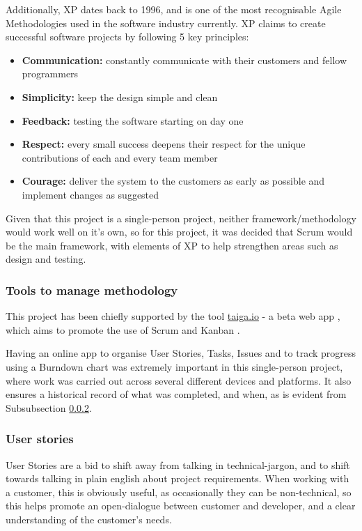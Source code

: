 Additionally, \acrfull{XP} \cite{xp} dates back to 1996, and is one of the most recognisable Agile Methodologies used in the software industry currently. \acrshort{XP} claims to create successful software projects by following 5 key principles:

\begin{itemize}
  \item \textbf{Communication: } constantly communicate with their customers and fellow programmers
  \item \textbf{Simplicity:} keep the design simple and clean
  \item \textbf{Feedback:} testing the software starting on day one
  \item \textbf{Respect: } every small success deepens their respect for the unique contributions of each and every team member
  \item \textbf{Courage: } deliver the system to the customers as early as possible and implement changes as suggested
\end{itemize}

Given that this project is a single-person project, neither framework/methodology would work well on it's own, so for this project, it was decided that Scrum would be the main framework, with elements of XP to help strengthen areas such as design and testing.

\subsubsection{Tools to manage methodology}

This project has been chiefly supported by the tool \url{taiga.io} - a beta web app \cite{Taiga.io}, which aims to promote the use of Scrum and Kanban \cite{kanban}.

Having an online app to organise User Stories, Tasks, Issues and to track progress using a Burndown chart was extremely important in this single-person project, where work was carried out across several different devices and platforms. It also ensures a historical record of what was completed, and when, as is evident from Subsubsection \ref{sssec:user-stories}.

\subsubsection{User stories}
\label{sssec:user-stories}

User Stories are a bid to shift away from talking in technical-jargon, and to shift towards talking in plain english about project requirements. When working with a customer, this is obviously useful, as occasionally they can be non-technical, so this helps promote an open-dialogue between customer and developer, and a clear understanding of the customer's needs.


